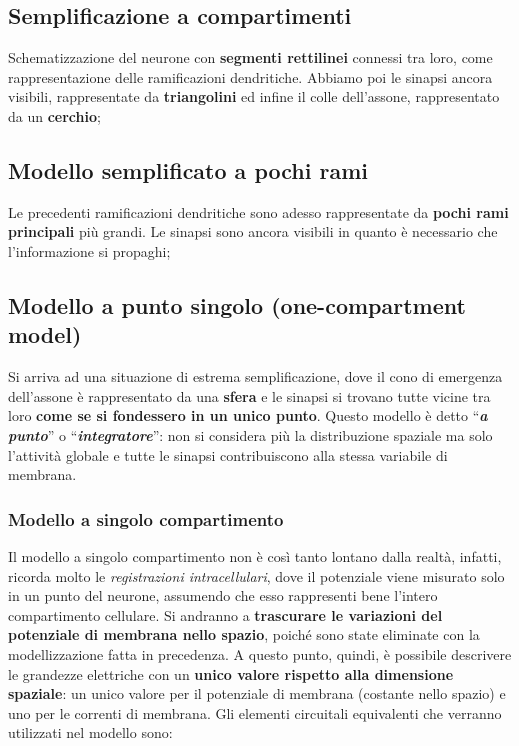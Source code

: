 \documentclass[12pt,a4paper,openany]{book}
\begin{document}
\subsection{Semplificazione a compartimenti}
Schematizzazione del neurone con \textbf{segmenti rettilinei }connessi tra loro, come rappresentazione delle ramificazioni dendritiche. Abbiamo poi le sinapsi ancora visibili, rappresentate da \textbf{triangolini }ed infine il colle dell'assone, rappresentato da un \textbf{cerchio};


\subsection{Modello semplificato a pochi rami}

Le precedenti ramificazioni dendritiche sono adesso rappresentate da \textbf{pochi rami principali }più grandi. Le sinapsi sono ancora visibili in quanto è necessario che l'informazione si propaghi;


\subsection{Modello a punto singolo (one-compartment model)}

Si arriva ad una situazione di estrema semplificazione, dove il cono di emergenza dell'assone è rappresentato da una \textbf{sfera }e le sinapsi si trovano tutte vicine tra loro \textbf{come se si fondessero in un unico punto}. Questo modello è detto ``\textbf{\textit{a}}\textbf{\textit{ }}\textbf{\textit{punto}}'' o ``\textbf{\textit{integratore}}'': non si considera più la distribuzione spaziale ma solo l'attività globale e tutte le sinapsi contribuiscono alla stessa variabile di membrana.

\subsubsection{Modello a singolo compartimento}

Il modello a singolo compartimento non è così tanto lontano dalla realtà, infatti, ricorda molto le \textit{registrazioni intracellulari}, dove il potenziale viene misurato solo in un punto del neurone, assumendo che esso rappresenti bene l'intero compartimento cellulare.
Si andranno a \textbf{trascurare le variazioni del potenziale di membrana nello spazio}, poiché sono state eliminate con la modellizzazione fatta in precedenza. A questo punto, quindi, è possibile descrivere le grandezze elettriche con un \textbf{unico valore rispetto alla dimensione spaziale}: un unico valore per il potenziale di membrana (costante nello spazio) e uno per le correnti di membrana.
Gli elementi circuitali equivalenti che verranno utilizzati nel modello sono:
\end{document}
